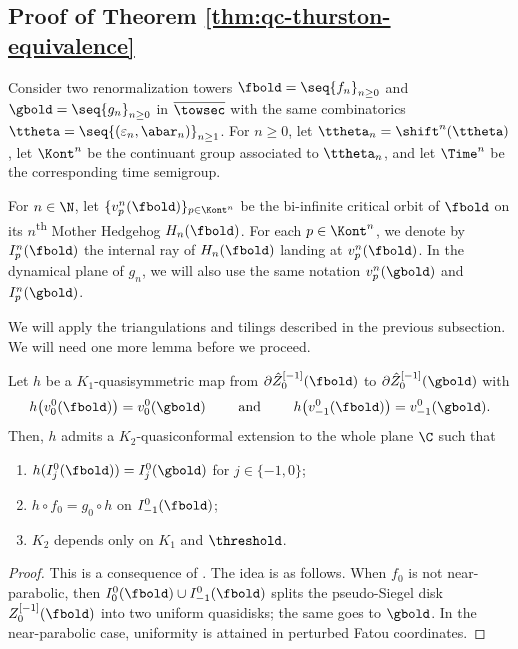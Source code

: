 \documentclass{amsart}
\begin{document}
\subsection{Proof of Theorem \ref{thm:qc-thurston-equivalence}}

Consider two renormalization towers $\fbold = \seq{f_n}_{n\geq 0}$ and $\gbold = \seq{g_n}_{n\geq 0}$ in $\overline{\towsec}$ with the same combinatorics $\ttheta = \seq{ (\varepsilon_n, \abar_n) }_{n\geq 1}$.
For $n \geq 0$, let $\ttheta_n = \shift^n(\ttheta)$, let $\Kont^{n}$ be the continuant group associated to $\ttheta_n$, and let $\Time^n$ be the corresponding time semigroup.

For $n \in \N$, let $\{v^n_p(\fbold)\}_{p \in \Kont^{n}}$ be the bi-infinite critical orbit of $\fbold$ on its $n$\textsuperscript{th} Mother Hedgehog $H_n(\fbold)$. 
For each $p \in \Kont^{n}$, we denote by $I^n_p(\fbold)$ the internal ray of $H_n(\fbold)$ landing at $v^n_p(\fbold)$.
In the dynamical plane of $g_n$, we will also use the same notation $v^n_p(\gbold)$ and $I^n_p(\gbold)$.

We will apply the triangulations and tilings described in the previous subsection.
We will need one more lemma before we proceed.

\begin{lemma}
\label{lem:dividing-pair-extension}
    Let $h$ be a $K_1$-quasisymmetric map from $\partial \hat{Z}_0^{[-1]}(\fbold)$ to $\partial \hat{Z}_0^{[-1]}(\gbold)$ with 
    \[
    h \big( v^0_0(\fbold) \big) = v^0_0(\gbold)
    \qquad \text{ and } \qquad 
    h \big( v^0_{-1}(\fbold) \big) = v^0_{-1}(\gbold).
    \]
    Then, $h$ admits a $K_2$-quasiconformal extension to the whole plane $\C$ such that
    \begin{enumerate}
        \item $h(I^0_j(\fbold)) = I^0_j(\gbold)$ for $j \in \{-1,0\}$;
        \item $h \circ f_0 = g_0 \circ h$ on $I^0_{-1}(\fbold)$;
        \item $K_2$ depends only on $K_1$ and $\threshold$.
    \end{enumerate}
\end{lemma}

\begin{proof}
    This is a consequence of \cite{DLy26a}.
    The idea is as follows.
    When $f_0$ is not near-parabolic, then $I_0^0(\fbold) \cup I_{-1}^0(\fbold)$ splits the pseudo-Siegel disk $Z_0^{[-1]}(\fbold)$ into two uniform quasidisks; the same goes to $\gbold$.
    In the near-parabolic case, uniformity is attained in perturbed Fatou coordinates.
\end{proof}
\end{document}

